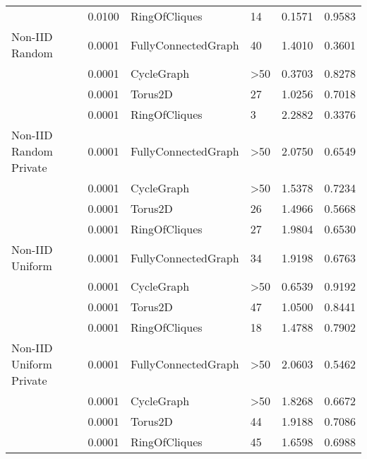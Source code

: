 \begin{tabular}{llllrr}
                        & 0.0100 &        RingOfCliques &          14 &           0.1571 &              0.9583 \\
Non-IID Random  & 0.0001 &  FullyConnectedGraph &          40 &           1.4010 &              0.3601 \\
                        & 0.0001 &           CycleGraph &         >50 &           0.3703 &              0.8278 \\
                        & 0.0001 &              Torus2D &          27 &           1.0256 &              0.7018 \\
                        & 0.0001 &        RingOfCliques &           3 &           2.2882 &              0.3376 \\
Non-IID Random Private & 0.0001 &  FullyConnectedGraph &         >50 &           2.0750 &              0.6549 \\
                        & 0.0001 &           CycleGraph &         >50 &           1.5378 &              0.7234 \\
                        & 0.0001 &              Torus2D &          26 &           1.4966 &              0.5668 \\
                        & 0.0001 &        RingOfCliques &          27 &           1.9804 &              0.6530 \\
Non-IID Uniform  & 0.0001 &  FullyConnectedGraph &          34 &           1.9198 &              0.6763 \\
                        & 0.0001 &           CycleGraph &         >50 &           0.6539 &              0.9192 \\
                        & 0.0001 &              Torus2D &          47 &           1.0500 &              0.8441 \\
                        & 0.0001 &        RingOfCliques &          18 &           1.4788 &              0.7902 \\
Non-IID Uniform Private & 0.0001 &  FullyConnectedGraph &         >50 &           2.0603 &              0.5462 \\
                        & 0.0001 &           CycleGraph &         >50 &           1.8268 &              0.6672 \\
                        & 0.0001 &              Torus2D &          44 &           1.9188 &              0.7086 \\
                        & 0.0001 &        RingOfCliques &          45 &           1.6598 &              0.6988 \\
\bottomrule
\end{tabular}

